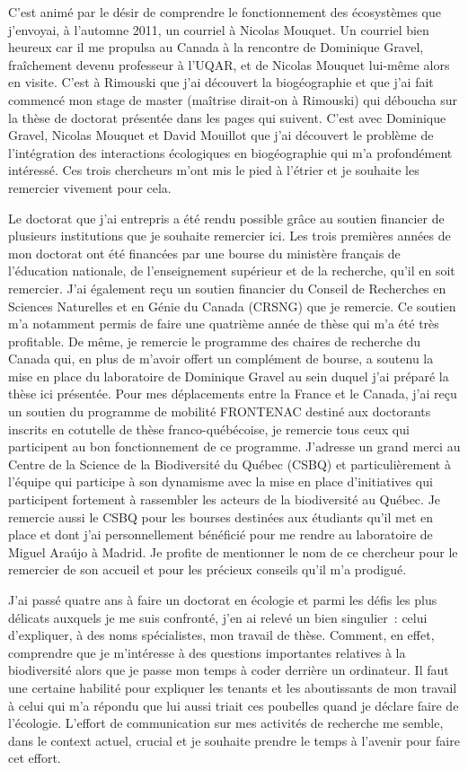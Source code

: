 C'est animé par le désir de comprendre le fonctionnement des écosystèmes
que j'envoyai, à l'automne 2011, un courriel à Nicolas Mouquet. Un
courriel bien heureux car il me propulsa au Canada à la rencontre de
Dominique Gravel, fraîchement devenu professeur à l'UQAR, et de Nicolas
Mouquet lui-même alors en visite. C'est à Rimouski que j'ai découvert la
biogéographie et que j'ai fait commencé mon stage de master (maîtrise
dirait-on à Rimouski) qui déboucha sur la thèse de doctorat présentée
dans les pages qui suivent. C'est avec Dominique Gravel, Nicolas Mouquet
et David Mouillot que j'ai découvert le problème de l'intégration des
interactions écologiques en biogéographie qui m'a profondément
intéressé. Ces trois chercheurs m'ont mis le pied à l'étrier et je
souhaite les remercier vivement pour cela.

Le doctorat que j'ai entrepris a été rendu possible grâce au soutien
financier de plusieurs institutions que je souhaite remercier ici. Les
trois premières années de mon doctorat ont été financées par une bourse
du ministère français de l'éducation nationale, de l'enseignement
supérieur et de la recherche, qu'il en soit remercier. J'ai également
reçu un soutien financier du Conseil de Recherches en Sciences
Naturelles et en Génie du Canada (CRSNG) que je remercie. Ce soutien m'a
notamment permis de faire une quatrième année de thèse qui m'a été très
profitable. De même, je remercie le programme des chaires de recherche
du Canada qui, en plus de m'avoir offert un complément de bourse, a
soutenu la mise en place du laboratoire de Dominique Gravel au sein
duquel j'ai préparé la thèse ici présentée. Pour mes déplacements entre
la France et le Canada, j'ai reçu un soutien du programme de mobilité
FRONTENAC destiné aux doctorants inscrits en cotutelle de thèse
franco-québécoise, je remercie tous ceux qui participent au bon
fonctionnement de ce programme. J'adresse un grand merci au Centre de la
Science de la Biodiversité du Québec (CSBQ) et particulièrement à
l'équipe qui participe à son dynamisme avec la mise en place
d'initiatives qui participent fortement à rassembler les acteurs de la
biodiversité au Québec. Je remercie aussi le CSBQ pour les bourses
destinées aux étudiants qu'il met en place et dont j'ai personnellement
bénéficié pour me rendre au laboratoire de Miguel Araújo à Madrid. Je
profite de mentionner le nom de ce chercheur pour le remercier de son
accueil et pour les précieux conseils qu'il m'a prodigué.

J'ai passé quatre ans à faire un doctorat en écologie et parmi les défis
les plus délicats auxquels je me suis confronté, j'en ai relevé un bien
singulier~: celui d'expliquer, à des noms spécialistes, mon travail de
thèse. Comment, en effet, comprendre que je m'intéresse à des questions
importantes relatives à la biodiversité alors que je passe mon temps à
coder derrière un ordinateur. Il faut une certaine habilité pour
expliquer les tenants et les aboutissants de mon travail à celui qui m'a
répondu que lui aussi triait ces poubelles quand je déclare faire de
l'écologie. L'effort de communication sur mes activités de recherche me
semble, dans le context actuel, crucial et je souhaite prendre le temps
à l'avenir pour faire cet effort.

